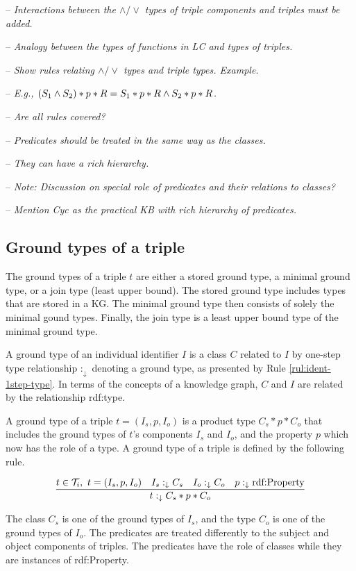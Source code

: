 \documentclass[runningheads]{llncs}
\newcommand{\darr}{\downarrow}
\newcommand{\T}{{\cal T}}
\newcommand{\notes}[1]{\noindent\begin{small}-- \emph{#1}\hfill\break\end{small}}
\newcommand{\nnotes}[1]{\indent\begin{small}-- \emph{#1}\hfill\break\end{small}}
\begin{document}
\notes{Interactions between the $\land/\lor$ types of triple components and triples must be added.}
\nnotes{Analogy between the types of functions in LC and types of triples.}
\nnotes{Show rules relating $\land/\lor$ types and triple types. Example.}
\nnotes{E.g., $(S_1\land\/S_2)*p*R = S_1*p*R\land\/S_2*p*R$.}
\nnotes{Are all rules covered?}

\notes{Predicates should be treated in the same way as the classes.}
\nnotes{They can have a rich hierarchy.}
\nnotes{\emph{Note:} Discussion on special role of predicates and their relations to classes?}
\nnotes{Mention Cyc as the practical KB with rich hierarchy of predicates.}







\subsection{Ground types of a triple\label{sec:3-ground-types}}

%
% 

\noindent
The ground types of a triple $t$ are either a stored ground type, a
minimal ground type, or a join type (least upper bound). The stored
ground type includes types that are stored in a KG. The minimal ground
type then consists of solely the minimal gound types. Finally, the
join type is a least upper bound type of the minimal ground type.

A ground type of an individual identifier $I$ is a class $C$ related
to $I$ by one-step type relationship $:_\darr$ denoting a ground type,
as presented by Rule \ref{rul:ident-1step-type}. In terms of the
concepts of a knowledge graph, $C$ and $I$ are related by the
relationship rdf:type.

A ground type of a triple $t=(I_s,p,I_o)$ is a product type
$C_s*p*C_o$ that includes the ground types of $t$'s components $I_s$
and $I_o$, and the property $p$ which now has the role of a type. A
ground type of a triple is defined by the following rule.

\begin{equation}
\label{rul:3-ground}
\dfrac{t\in\/\T_i,\ t=(I_s,p,I_o)\quad I_s:_\darr\/C_s\quad I_o:_\darr\/C_o\quad p:_\darr\text{rdf:Property}}
      {t:_\darr\/C_s*p*C_o}
\end{equation}

The class $C_s$ is one of the ground types of $I_s$, and the type $C_o$
is one of the ground types of $I_o$. The predicates are treated
differently to the subject and object components of triples. The
predicates have the role of classes while they are instances of
rdf:Property.
\end{document}
